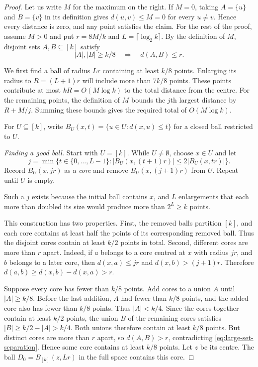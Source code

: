 \documentclass[11pt,letterpaper]{article}
\theoremstyle{definition}
\theoremstyle{remark}
\begin{document}
\begin{proof}
Let us write $M$ for the maximum on the right.
If $M=0$, taking $A=\{u\}$ and $B=\{v\}$ in its definition gives
$d(u,v)\le M=0$ for every $u\ne v$. Hence every distance is zero,
and any point satisfies the claim. For the rest of the proof, assume
$M>0$ and put $r=8M/k$ and $L=\lceil\log_2 k\rceil$.
By the definition of $M$, disjoint sets $A,B\subseteq[k]$ satisfy
\begin{equation}\label{eq:large-set-separation}
 |A|,|B|\ge k/8\quad\Longrightarrow\quad d(A,B)\le r.
\end{equation}

We first find a ball of radius $Lr$ containing at least $k/8$ points.
Enlarging its radius to $R=(L+1)r$ will include more than $7k/8$ points.
These points contribute at most $kR=O(M\log k)$ to the total distance
from the centre. For the remaining points, the definition of $M$ bounds
the $j$th largest distance by $R+M/j$. Summing these bounds gives the
required total of $O(M\log k)$.

For $U\subseteq[k]$, write
$B_U(x,t)=\{u\in U:d(x,u)\le t\}$ for a closed ball restricted to $U$.

\smallskip
\textit{Finding a good ball.}
Start with $U=[k]$. While $U\ne\emptyset$, choose $x\in U$ and let
\[
 j=\min\bigl\{t\in\{0,\ldots,L-1\}:
 |B_U(x,(t+1)r)|\le2|B_U(x,tr)|\bigr\}.
\]
Record $B_U(x,jr)$ as a \emph{core} and remove $B_U(x,(j+1)r)$ from $U$.
Repeat until $U$ is empty.

Such a $j$ exists because the initial ball contains $x$, and $L$
enlargements that each more than doubled its size would produce more
than $2^L\ge k$ points.

This construction has two properties. First, the removed balls
partition $[k]$, and each core contains at least half the points of its
corresponding removed ball. Thus the disjoint cores contain at least $k/2$ points in
total. Second, different cores are more than $r$ apart. Indeed, if $a$
belongs to a core centred at $x$ with radius $jr$, and $b$ belongs
to a later core, then $d(x,a)\le jr$ and $d(x,b)>(j+1)r$. Therefore
$d(a,b)\ge d(x,b)-d(x,a)>r$.

Suppose every core has fewer than $k/8$ points. Add cores to a union $A$
until $|A|\ge k/8$. Before the last addition, $A$ had fewer than $k/8$
points, and the added core also has fewer than $k/8$ points. Thus
$|A|<k/4$. Since the cores together contain at least $k/2$ points,
the union $B$ of the remaining cores satisfies
\(
 |B|\ge k/2-|A|>k/4.
\)
Both unions therefore contain at least $k/8$ points. But distinct cores
are more than $r$ apart, so $d(A,B)>r$, contradicting
\eqref{eq:large-set-separation}. Hence some core contains at least $k/8$
points. Let $z$ be its centre.
The ball $D_0=B_{[k]}(z,Lr)$ in the full space contains this core.


\end{proof}
\end{document}
